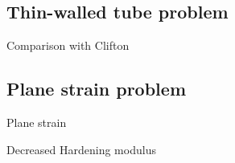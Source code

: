 

\subsection{Thin-walled tube problem}
\begin{frame}{Comparison with Clifton}
  
  
  
\end{frame}

\subsection{Plane strain problem}
\begin{frame}{Plane strain}
   
   
   
   
   
\end{frame}


\begin{frame}{Decreased Hardening modulus}
   
   
   
\end{frame}

